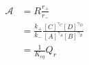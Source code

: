\begin{eqnarray}\label{eqn:reaction-affinity-ratio}
\mathcal A &= R\frac{r_+}{r_-} \\
& = \frac{k_+}{k_-}\frac{[C]^{\gamma_C}[D]^{\gamma_D}}{[A]^{\gamma_A}[B]^{\gamma_B}} \\
& = \frac{1}{K_{eq}}{Q_r} \\
\end{eqnarray}
